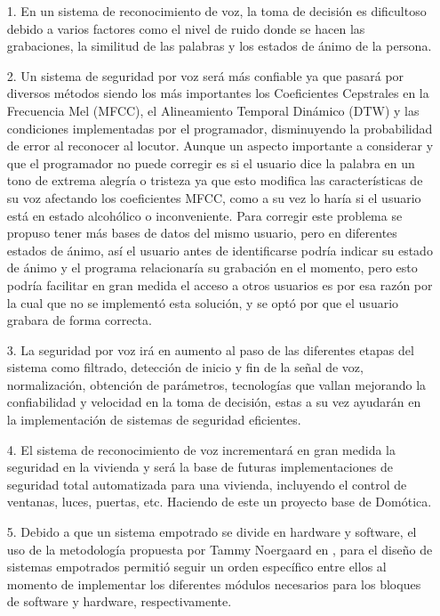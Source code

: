 \begin{enumerate}
\item[1.]En un sistema de reconocimiento de voz, la toma de decisión es dificultoso debido a varios factores como el nivel de ruido donde se hacen las grabaciones, la similitud de las palabras y los estados de ánimo de la persona.

\item[2.]Un sistema de seguridad por voz será más confiable ya que pasará por diversos métodos siendo los más importantes los Coeficientes Cepstrales en la Frecuencia Mel (MFCC), el Alineamiento Temporal Dinámico (DTW) y las condiciones implementadas por el programador, disminuyendo la probabilidad de error al reconocer al locutor. 
\vskip 0.5cm
Aunque un aspecto importante a considerar y que el programador no puede corregir es si el usuario dice la palabra en un tono de extrema alegría o tristeza ya que esto modifica las características de su voz afectando los coeficientes MFCC, como a su vez lo haría si el usuario está en estado alcohólico o inconveniente. 
\vskip 0.5cm
Para corregir este problema se propuso tener más bases de datos del mismo usuario, pero en diferentes estados de ánimo, así el usuario antes de identificarse podría indicar su estado de ánimo y el programa relacionaría su grabación en el momento, pero esto podría facilitar en gran medida el acceso a otros usuarios es por esa razón por la cual que no se implementó esta solución, y se optó por que el usuario grabara de forma correcta.

\item[3.]La seguridad por voz irá en aumento al paso de las diferentes etapas del sistema como filtrado, detección de inicio y fin de la señal de voz, normalización, obtención de parámetros, tecnologías que vallan mejorando la confiabilidad y velocidad en la toma de decisión, estas a su vez ayudarán en la implementación de sistemas de seguridad eficientes.

\item[4.]El sistema de reconocimiento de voz incrementará en gran medida la seguridad en la vivienda y será la base de futuras implementaciones de seguridad total automatizada para una vivienda, incluyendo el control de ventanas, luces, puertas, etc. Haciendo de este un proyecto base de Domótica.

\item[5.]Debido a que un sistema empotrado se divide en hardware y software, el uso de la metodología propuesta por Tammy Noergaard en \citep{tammy}, para el diseño de sistemas empotrados permitió seguir un orden específico entre ellos al momento de implementar los diferentes módulos necesarios para los bloques de software y hardware, respectivamente.


\end{enumerate}
